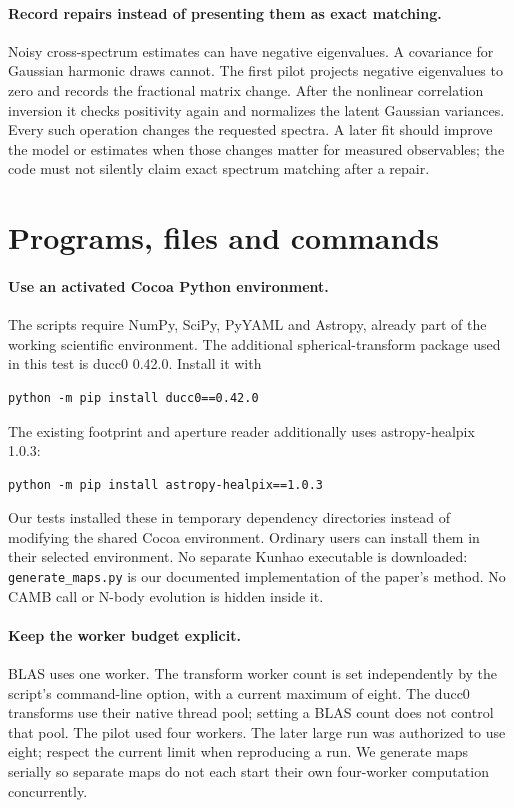 \documentclass[11pt]{article}
\begin{document}
\paragraph{Record repairs instead of presenting them as exact matching.}
Noisy cross-spectrum estimates can have negative eigenvalues. A covariance
for Gaussian harmonic draws cannot. The first pilot projects negative
eigenvalues to zero and records the fractional matrix change. After the
nonlinear correlation inversion it checks positivity again and normalizes
the latent Gaussian variances. Every such operation changes the requested
spectra. A later fit should improve the model or estimates when those
changes matter for measured observables; the code must not silently claim
exact spectrum matching after a repair.

\section{Programs, files and commands}
\paragraph{Use an activated Cocoa Python environment.}
The scripts require NumPy, SciPy, PyYAML and Astropy, already part of the
working scientific environment. The additional spherical-transform package
used in this test is ducc0 0.42.0. Install it with
\begin{lstlisting}
python -m pip install ducc0==0.42.0
\end{lstlisting}
The existing footprint and aperture reader additionally uses
astropy-healpix 1.0.3:
\begin{lstlisting}
python -m pip install astropy-healpix==1.0.3
\end{lstlisting}
Our tests installed these in temporary dependency directories instead of
modifying the shared Cocoa environment. Ordinary users can install them
in their selected environment. No separate Kunhao executable is downloaded:
\texttt{generate\_maps.py} is our documented implementation of the paper's
method. No CAMB call or N-body evolution is hidden inside it.

\paragraph{Keep the worker budget explicit.}
BLAS uses one worker. The transform worker count is set independently by
the script's command-line option, with a current maximum of eight. The ducc0
transforms use their native thread pool; setting a BLAS count does not
control that pool. The pilot used four workers. The later large run was authorized to use
eight; respect the current limit when reproducing a run. We generate maps serially so separate maps
do not each start their own four-worker computation concurrently.
\end{document}
